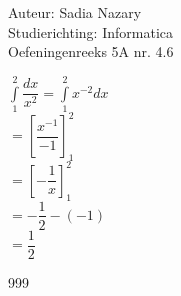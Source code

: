 \documentclass[a4paper]{article}
\begin{document}
\noindent \large Auteur: Sadia Nazary \\
\noindent \large Studierichting: Informatica\\
\noindent \large Oefeningenreeks 5A nr. 4.6\\

\medskip

\normalsize

$\displaystyle\int\limits_{1}^{2} \dfrac{dx}{x^2} = \int\limits_{1}^{2} x^{-2}dx $ \\

$ = \left[\dfrac{x^{-1}}{-1}\right]_{1}^{2} $ \\

$ = \left[-\dfrac{1}{x}\right]_{1}^{2} $ \\

$ = -\dfrac{1}{2} - (-1) $ \\

$ = \dfrac{1}{2} $ \\



\begin{thebibliography}{999}
\end{thebibliography}
\end{document}
